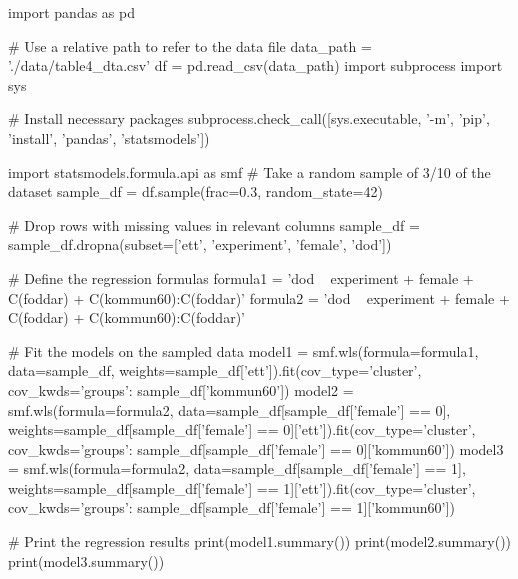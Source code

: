 import pandas as pd

# Use a relative path to refer to the data file
data_path = './data/table4_dta.csv'
df = pd.read_csv(data_path)
import subprocess
import sys

# Install necessary packages
subprocess.check_call([sys.executable, '-m', 'pip', 'install', 'pandas', 'statsmodels'])

import statsmodels.formula.api as smf
# Take a random sample of 3/10 of the dataset
sample_df = df.sample(frac=0.3, random_state=42)

# Drop rows with missing values in relevant columns
sample_df = sample_df.dropna(subset=['ett', 'experiment', 'female', 'dod'])

# Define the regression formulas
formula1 = 'dod ~ experiment + female + C(foddar) + C(kommun60):C(foddar)'
formula2 = 'dod ~ experiment + female + C(foddar) + C(kommun60):C(foddar)'

# Fit the models on the sampled data
model1 = smf.wls(formula=formula1, data=sample_df, weights=sample_df['ett']).fit(cov_type='cluster', cov_kwds={'groups': sample_df['kommun60']})
model2 = smf.wls(formula=formula2, data=sample_df[sample_df['female'] == 0], weights=sample_df[sample_df['female'] == 0]['ett']).fit(cov_type='cluster', cov_kwds={'groups': sample_df[sample_df['female'] == 0]['kommun60']})
model3 = smf.wls(formula=formula2, data=sample_df[sample_df['female'] == 1], weights=sample_df[sample_df['female'] == 1]['ett']).fit(cov_type='cluster', cov_kwds={'groups': sample_df[sample_df['female'] == 1]['kommun60']})

# Print the regression results
print(model1.summary())
print(model2.summary())
print(model3.summary())